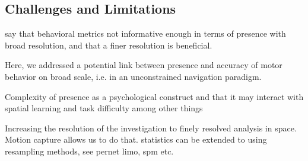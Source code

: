 \subsection{Challenges and Limitations}

say that behavioral metrics not informative enough in terms of presence with broad resolution, and that a finer resolution is beneficial.

Here, we addressed a potential link between presence and accuracy of motor behavior on broad scale, i.e. in an unconstrained navigation paradigm. 

Complexity of presence as a psychological construct and that it may interact with spatial learning and task difficulty among other things~\cite{} %

Increasing the resolution of the investigation to finely resolved analysis in space. Motion capture allows us to do that. 
statistics can be extended to using resampling methods, see pernet limo, spm etc.